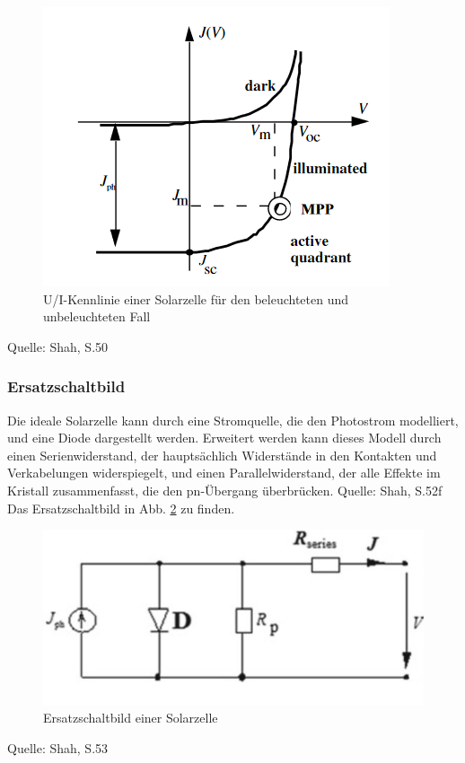 \begin{figure}[h]
    \centering
    \includegraphics[scale=0.75]{Bilder/Kennlinien.png}
    \caption{U/I-Kennlinie einer Solarzelle für den beleuchteten und unbeleuchteten Fall}
    \label{bild:kennlinien}
\end{figure}

Quelle: Shah, S.50

\subsubsection{Ersatzschaltbild}
Die ideale Solarzelle kann durch eine Stromquelle, die den Photostrom modelliert, und eine Diode dargestellt werden. 
Erweitert werden kann dieses Modell durch einen Serienwiderstand, der hauptsächlich Widerstände in den Kontakten und Verkabelungen
widerspiegelt, und einen Parallelwiderstand, der alle Effekte im Kristall zusammenfasst, die den pn-Übergang überbrücken.
Quelle: Shah, S.52f 
Das Ersatzschaltbild in Abb. \ref{bild:ersatzschaltbild} zu finden.

\begin{figure}[h]
    \centering
    \includegraphics[scale=0.5]{Bilder/Ersatzschaltbild.png}
    \caption{Ersatzschaltbild einer Solarzelle}
    \label{bild:ersatzschaltbild}
\end{figure}
Quelle: Shah, S.53

